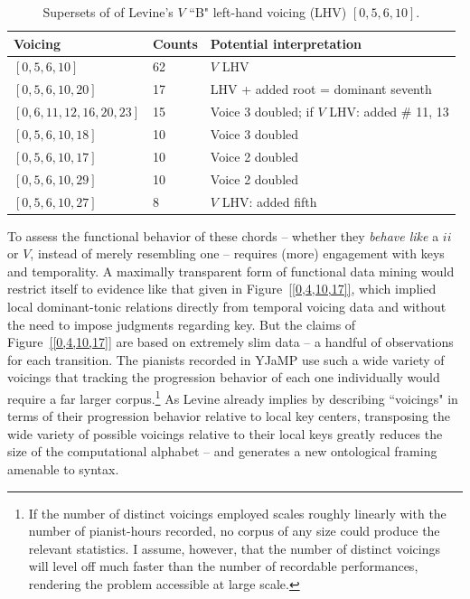 \begin{table}%
  \caption{Supersets of of Levine's $V$ ``B" left-hand voicing (LHV) $[0,5,6,10]$.}
  \centering
\begin{tabular}{l| l | l}
\hline\hline
Voicing & Counts & Potential interpretation \\ [0.5ex]
\hline
$[0,5,6,10]$ & 62 & $V$ LHV \\
$[0,5,6,10,20]$ & 17 & LHV + added root = dominant seventh \\
$[0,6,11,12,16,20,23]$ & 15 & Voice 3 doubled; if $V$ LHV: added \# 11, 13 \\
$[0,5,6,10,18]$ & 10 & Voice 3 doubled \\
$[0,5,6,10,17]$ & 10 & Voice 2 doubled \\
$[0,5,6,10,29]$ & 10 & Voice 2 doubled \\
$[0,5,6,10,27]$ & 8 & $V$ LHV: added fifth \\[1ex]
\hline
\end{tabular}
\label{b_V_lhv}
\end{table}

To assess the functional behavior of these chords -- whether they \emph{behave like} a $ii$ or $V$, instead of merely resembling one -- requires (more) engagement with keys and temporality.  A maximally transparent form of functional data mining would restrict itself to evidence like that given in Figure~\ref{[0,4,10,17]}, which implied local dominant-tonic relations directly from temporal voicing data and without the need to impose judgments regarding key.  But the claims of  Figure~\ref{[0,4,10,17]} are based on extremely slim data -- a handful of observations for each transition.  The pianists recorded in YJaMP use such a wide variety of voicings that tracking the progression behavior of each one individually would require a far larger corpus.\footnote{If the number of distinct voicings employed scales roughly linearly with the number of pianist-hours recorded, no corpus of any size could produce the relevant statistics.  I assume, however, that the number of distinct voicings will level off much faster than the number of recordable performances, rendering the problem accessible at large scale.}  As Levine already implies by describing ``voicings" in terms of their progression behavior relative to local key centers, transposing the wide variety of possible voicings relative to their local keys greatly reduces the size of the computational alphabet -- and generates a new ontological framing amenable to syntax.

